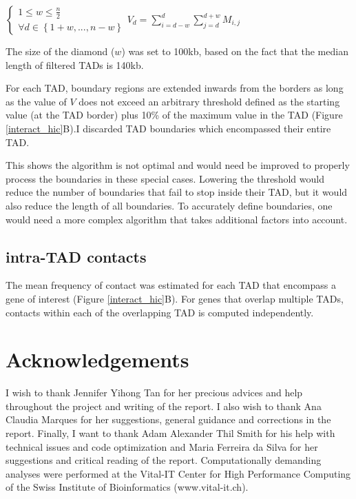 \documentclass[11pt,a4paper]{report}
\begin{document}
\vspace{0.2in}
$\left\{\begin{matrix}1\leq w\leq \frac{n}{2} \\ \forall d\in\left \{ 1+w , ... , n-w \right \}\end{matrix}\right. V_{d}=\sum_{i=d-w}^{d}\sum_{j=d}^{d+w}M_{i,j}$
\vspace{0.2in}

\noindent The size of the diamond ($w$) was set to 100kb, based on the fact that the median length of filtered TADs is 140kb.

For each TAD, boundary regions are extended inwards from the borders as long as the value of $V$ does not exceed an arbitrary threshold defined as the starting value (at the TAD border) plus 10\% of the maximum value in the TAD (Figure \ref{interact_hic}B).I discarded TAD boundaries which encompassed their entire TAD. 

This shows the algorithm is not optimal and would need be improved to properly process the boundaries in these special cases. Lowering the threshold would reduce the number of boundaries that fail to stop inside their TAD, but it would also reduce the length of all boundaries. To accurately define boundaries, one would need a more complex algorithm that takes additional factors into account.

\subsection*{intra-TAD contacts}

The mean frequency of contact was estimated for each TAD that encompass a gene of interest (Figure \ref{interact_hic}B). For genes that overlap multiple TADs, contacts within each of the overlapping TAD is computed independently.

\section*{Acknowledgements}
I wish to thank Jennifer Yihong Tan for her precious advices and help throughout the project and writing of the report. I also wish to thank Ana Claudia Marques for her suggestions, general guidance and corrections in the report. Finally, I want to thank Adam Alexander Thil Smith for  his help with technical issues and code optimization and Maria Ferreira da Silva for her suggestions and critical reading of the report.
Computationally demanding analyses were performed at the Vital-IT Center for High Performance Computing of the Swiss Institute of Bioinformatics (www.vital-it.ch).
\end{document}
